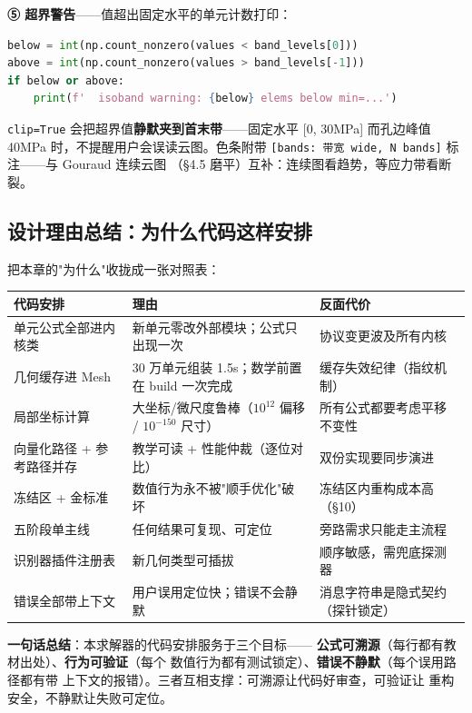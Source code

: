 \documentclass[12pt,a4paper]{ctexart}
\newcommand{\fem}{\Verb}
\begin{document}
\textbf{⑤ 超界警告}——值超出固定水平的单元计数打印：

\begin{lstlisting}[language=python]
below = int(np.count_nonzero(values < band_levels[0]))
above = int(np.count_nonzero(values > band_levels[-1]))
if below or above:
    print(f'  isoband warning: {below} elems below min=...')
\end{lstlisting}

\fem|clip=True| 会把超界值\textbf{静默夹到首末带}——固定水平
[0, 30MPa] 而孔边峰值 40MPa 时，不提醒用户会误读云图。色条附带
\fem|[bands: 带宽 wide, N bands]| 标注——与 Gouraud 连续云图
（§4.5 磨平）互补：连续图看趋势，等应力带看断裂。

\subsection{设计理由总结：为什么代码这样安排}

把本章的"为什么"收拢成一张对照表：

\begin{table}[h]
\centering
\small
\begin{tabular}{p{5.2cm}p{5.8cm}p{4.0cm}}
\toprule
\textbf{代码安排} & \textbf{理由} & \textbf{反面代价} \\
\midrule
单元公式全部进内核类 & 新单元零改外部模块；公式只出现一次 & 协议变更波及所有内核 \\
几何缓存进 Mesh & 30 万单元组装 1.5s；数学前置在 build 一次完成 & 缓存失效纪律（指纹机制） \\
局部坐标计算 & 大坐标/微尺度鲁棒（$10^{12}$ 偏移 / $10^{-150}$ 尺寸） & 所有公式都要考虑平移不变性 \\
向量化路径 + 参考路径并存 & 教学可读 + 性能仲裁（逐位对比） & 双份实现要同步演进 \\
冻结区 + 金标准 & 数值行为永不被"顺手优化"破坏 & 冻结区内重构成本高（§10） \\
五阶段单主线 & 任何结果可复现、可定位 & 旁路需求只能走主流程 \\
识别器插件注册表 & 新几何类型可插拔 & 顺序敏感，需兜底探测器 \\
错误全部带上下文 & 用户误用定位快；错误不会静默 & 消息字符串是隐式契约（探针锁定） \\
\bottomrule
\end{tabular}
\end{table}

\textbf{一句话总结}：本求解器的代码安排服务于三个目标——
\textbf{公式可溯源}（每行都有教材出处）、\textbf{行为可验证}（每个
数值行为都有测试锁定）、\textbf{错误不静默}（每个误用路径都有带
上下文的报错）。三者互相支撑：可溯源让代码好审查，可验证让
重构安全，不静默让失败可定位。
\end{document}
